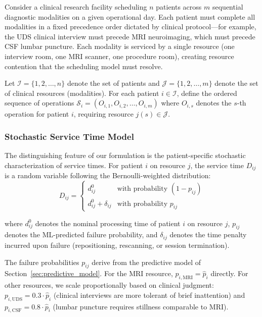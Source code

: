 \documentclass[11pt,a4paper]{article}
\begin{document}
Consider a clinical research facility scheduling $n$ patients across $m$ sequential diagnostic modalities on a given operational day. Each patient must complete all modalities in a fixed precedence order dictated by clinical protocol---for example, the UDS clinical interview must precede MRI neuroimaging, which must precede CSF lumbar puncture. Each modality is serviced by a single resource (one interview room, one MRI scanner, one procedure room), creating resource contention that the scheduling model must resolve.

Let $\mathcal{I} = \{1, 2, \ldots, n\}$ denote the set of patients and $\mathcal{J} = \{1, 2, \ldots, m\}$ denote the set of clinical resources (modalities). For each patient $i \in \mathcal{I}$, define the ordered sequence of operations $\mathcal{S}_i = (O_{i,1}, O_{i,2}, \ldots, O_{i,m})$ where $O_{i,s}$ denotes the $s$-th operation for patient $i$, requiring resource $j(s) \in \mathcal{J}$.

\subsubsection{Stochastic Service Time Model}

The distinguishing feature of our formulation is the patient-specific stochastic characterization of service times. For patient $i$ on resource $j$, the service time $D_{ij}$ is a random variable following the Bernoulli-weighted distribution:
\begin{equation}
D_{ij} = 
\begin{cases}
d_{ij}^0 & \text{with probability } (1 - p_{ij}) \\
d_{ij}^0 + \delta_{ij} & \text{with probability } p_{ij}
\end{cases}
\label{eq:service_time_rv}
\end{equation}

where $d_{ij}^0$ denotes the nominal processing time of patient $i$ on resource $j$, $p_{ij}$ denotes the ML-predicted failure probability, and $\delta_{ij}$ denotes the time penalty incurred upon failure (repositioning, rescanning, or session termination).

The failure probabilities $p_{ij}$ derive from the predictive model of Section~\ref{sec:predictive_model}. For the MRI resource, $p_{i,\text{MRI}} = \hat{p}_i$ directly. For other resources, we scale proportionally based on clinical judgment: $p_{i,\text{UDS}} = 0.3 \cdot \hat{p}_i$ (clinical interviews are more tolerant of brief inattention) and $p_{i,\text{CSF}} = 0.8 \cdot \hat{p}_i$ (lumbar puncture requires stillness comparable to MRI).
\end{document}
